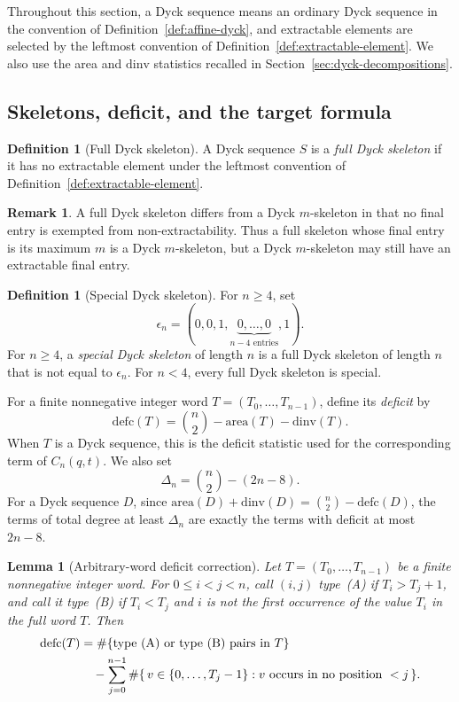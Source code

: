 \documentclass[11pt]{article}
\theoremstyle{plain}
\newtheorem{lemma}[theorem]{Lemma}
\theoremstyle{definition}
\newtheorem{definition}[theorem]{Definition}
\newtheorem{remark}[theorem]{Remark}
\theoremstyle{remark}
\newcommand{\dinv}{\mathrm{dinv}}
\newcommand{\area}{\mathrm{area}}
\newcommand{\defc}{\mathrm{defc}}
\begin{document}
Throughout this section, a Dyck sequence means an ordinary Dyck sequence in
the convention of Definition~\ref{def:affine-dyck}, and extractable elements
are selected by the leftmost convention of Definition~\ref{def:extractable-element}.
We also use the area and \(\dinv\) statistics recalled in
Section~\ref{sec:dyck-decompositions}.

\subsection{Skeletons, deficit, and the target formula}

\begin{definition}[Full Dyck skeleton]
\label{def:full-dyck-skeleton}
A Dyck sequence \(S\) is a \emph{full Dyck skeleton} if it has no extractable
element under the leftmost convention of
Definition~\ref{def:extractable-element}.
\end{definition}

\begin{remark}
\label{rem:full-versus-m-skeleton}
A full Dyck skeleton differs from a Dyck \(m\)-skeleton in that no final entry
is exempted from non-extractability. Thus a full skeleton whose final entry is
its maximum \(m\) is a Dyck \(m\)-skeleton, but a Dyck \(m\)-skeleton may still
have an extractable final entry.
\end{remark}

\begin{definition}[Special Dyck skeleton]
\label{def:special-dyck-skeleton}
For \(n\ge 4\), set
\[
  \epsilon_n=(0,0,1,\underbrace{0,\ldots,0}_{n-4\text{ entries}},1).
\]
For \(n\ge4\), a \emph{special Dyck skeleton} of length \(n\) is a full Dyck
skeleton of length \(n\) that is not equal to \(\epsilon_n\).  For \(n<4\),
every full Dyck skeleton is special.
\end{definition}

For a finite nonnegative integer word \(T=(T_0,\ldots,T_{n-1})\), define its
\emph{deficit} by
\[
  \defc(T)=\binom{n}{2}-\area(T)-\dinv(T).
\]
When \(T\) is a Dyck sequence, this is the deficit statistic used for the
corresponding term of \(C_n(q,t)\).
We also set
\[
  \Delta_n=\binom{n}{2}-(2n-8).
\]
For a Dyck sequence \(D\), since
\(\area(D)+\dinv(D)=\binom{n}{2}-\defc(D)\), the terms of total degree at least
\(\Delta_n\) are exactly the terms with deficit at most \(2n-8\).

\begin{lemma}[Arbitrary-word deficit correction]
\label{lem:extended-deficit-pairs}
Let \(T=(T_0,\ldots,T_{n-1})\) be a finite nonnegative integer word.
For \(0\le i<j<n\), call \((i,j)\) type~\textup{(A)} if \(T_i>T_j+1\), and
call it type~\textup{(B)} if \(T_i<T_j\) and \(i\) is not the first occurrence
of the value \(T_i\) in the full word \(T\).  Then
\begin{align*}
  \defc(T)
  &=
  \#\{\text{type~\textup{(A)} or type~\textup{(B)} pairs in }T\} \\
  &\quad -
  \sum_{j=0}^{n-1}
  \#\{\,v\in\{0,\ldots,T_j-1\}:
       v\text{ occurs in no position }<j\,\}.
\end{align*}
\end{lemma}
\end{document}
